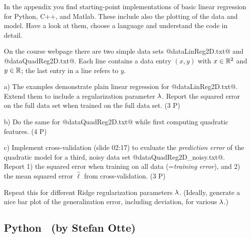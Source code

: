 

\renewcommand{\course}{Machine Learning}
\renewcommand{\exnum}{2}

\exercises
{}
\exercisestitle


In the appendix you find starting-point implementations of basic
linear regression for Python, C++, and Matlab. These include also the
plotting of the data and model. Have a look at them, choose a language and
understand the code in detail.

On the course webpage there are two simple data sets
@dataLinReg2D.txt@ and @dataQuadReg2D.txt@. Each line contains a data
entry $(x,y)$ with $x\in{\mathbb{R}}^2$ and $y\in{\mathbb{R}}$; the last entry in a
line refers to $y$.

a) The examples demonstrate plain linear regression for
@dataLinReg2D.txt@. Extend them to include a regularization parameter
$\lambda$. Report the squared error on the full data set when trained on
the full data set. (3 P)

b) Do the same for @dataQuadReg2D.txt@ while first computing quadratic
 features. (4 P)

c) Implement cross-validation (slide 02:17) to evaluate the
\emph{prediction error} of the quadratic model for a third, noisy data
set @dataQuadReg2D_noisy.txt@. Report 1) the squared error when
training on all data (=\emph{training error}), and 2) the mean squared
error $\hat\ell$ from cross-validation. (3 P)

Repeat this for different Ridge regularization parameters
$\lambda$. (Ideally, generate a nice bar plot of the generalization error,
including deviation, for various $\lambda$.)



\subsection*{Python~ (by Stefan Otte)}

